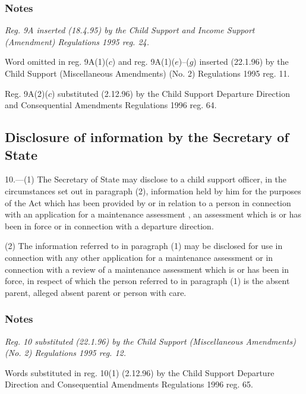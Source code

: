 \documentclass[a4paper]{article}
\newcommand\amendment[1]{\subsubsection*{Notes}{\itshape\frenchspacing\footnotesize #1 \par}}
\begin{document}
\amendment{
Reg. 9A inserted (18.4.95) by the Child Support and Income Support (Amendment) Regulations 1995 reg. 24.

Word omitted in reg. 9A(1)($c$) and reg. 9A(1)($e$)--($g$) inserted (22.1.96) by the Child Support (Miscellaneous Amendments) (No. 2) Regulations 1995 reg. 11.

Reg. 9A(2)($c$) substituted (2.12.96) by the Child Support Departure Direction and Consequential Amendments Regulations 1996 reg. 64.
}

%

\subsection[10. Disclosure of information by the Secretary of State]{Disclosure of information by the Secretary of State}

10.—(1) The Secretary of State may disclose to a child support officer, in the circumstances set out in paragraph (2), information held by him for the purposes of the Act which has been provided by or in relation to a person in connection with an application for a maintenance assessment%
, an assessment which is or has been in force or in connection with a departure direction.  %

(2) The information referred to in paragraph (1) may be disclosed for use in connection with any other application for a maintenance assessment or in connection with a review of a maintenance assessment which is or has been in force, in respect of which the person referred to in paragraph (1) is the absent parent, alleged absent parent or person with care.

\amendment{
Reg. 10 substituted (22.1.96) by the Child Support (Miscellaneous Amendments) (No. 2) Regulations 1995 reg. 12.

Words substituted in reg. 10(1) (2.12.96) by the Child Support Departure Direction and Consequential Amendments Regulations 1996 reg. 65.
}
\end{document}
